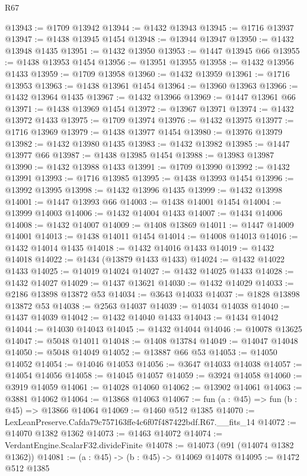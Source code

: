 \begin{lexlean}{R67}
\begin{coremodule}
@13943 := @1709 @13942
@13944 := @1432 @13943
@13945 := @1716 @13937
@13947 := @1438 @13945 @1454
@13948 := @13944 @13947
@13950 := @1432 @13948 @1435
@13951 := @1432 @13950
@13953 := @1447 @13945 @66
@13955 := @1438 @13953 @1454
@13956 := @13951 @13955
@13958 := @1432 @13956 @1433
@13959 := @1709 @13958
@13960 := @1432 @13959
@13961 := @1716 @13953
@13963 := @1438 @13961 @1454
@13964 := @13960 @13963
@13966 := @1432 @13964 @1435
@13967 := @1432 @13966
@13969 := @1447 @13961 @66
@13971 := @1438 @13969 @1454
@13972 := @13967 @13971
@13974 := @1432 @13972 @1433
@13975 := @1709 @13974
@13976 := @1432 @13975
@13977 := @1716 @13969
@13979 := @1438 @13977 @1454
@13980 := @13976 @13979
@13982 := @1432 @13980 @1435
@13983 := @1432 @13982
@13985 := @1447 @13977 @66
@13987 := @1438 @13985 @1454
@13988 := @13983 @13987
@13990 := @1432 @13988 @1433
@13991 := @1709 @13990
@13992 := @1432 @13991
@13993 := @1716 @13985
@13995 := @1438 @13993 @1454
@13996 := @13992 @13995
@13998 := @1432 @13996 @1435
@13999 := @1432 @13998
@14001 := @1447 @13993 @66
@14003 := @1438 @14001 @1454
@14004 := @13999 @14003
@14006 := @1432 @14004 @1433
@14007 := @1434 @14006
@14008 := @1432 @14007
@14009 := @1408 @13869
@14011 := @1447 @14009 @14001
@14013 := @1438 @14011 @1454
@14014 := @14008 @14013
@14016 := @1432 @14014 @1435
@14018 := @1432 @14016 @1433
@14019 := @1432 @14018
@14022 := @1434 (@13879 @1433 @1433)
@14024 := @1432 @14022 @1433
@14025 := @14019 @14024
@14027 := @1432 @14025 @1433
@14028 := @1432 @14027
@14029 := @1437 @13621
@14030 := @1432 @14029
@14033 := @2186 @13898 @13872 @53
@14034 := @3643 @14033
@14037 := @1828 @13898 @13872 @53
@14038 := @2563 @14037
@14039 := @14034 @14038
@14040 := @1437 @14039
@14042 := @1432 @14040 @1433
@14043 := @1434 @14042
@14044 := @14030 @14043
@14045 := @1432 @14044
@14046 := @10078 @13625
@14047 := @5048 @14011
@14048 := @1408 @13784
@14049 := @14047 @14048
@14050 := @5048 @14049
@14052 := @13887 @66 @53
@14053 := @14050 @14052
@14054 := @14046 @14053
@14056 := @3647 @14033 @14038
@14057 := @14054 @14056
@14058 := @14045 @14057
@14059 := @3924 @14058
@14060 := @3919 @14059
@14061 := @14028 @14060
@14062 := @13902 @14061
@14063 := @3881 @14062
@14064 := @13868 @14063
@14067 := fun (a : @45) => fun (b : @45) => @13866 @14064
@14069 := @1460 @512 @1385
@14070 := LexLeanPreserve.Cafda79c757163ffe4c6f07f487422bdf.R67.__fits_14
@14072 := @14070 @1382 @1362
@14073 := @1463 @14072
@14074 := VerdantEngine.ScalarF32.divideFinite
@14078 := @14073 (@91 (@14074 @1382 @1362))
@14081 := (a : @45) -> (b : @45) -> @14069 @14078
@14095 := @1472
    @512
    @1385

\end{coremodule}
\end{lexlean}
